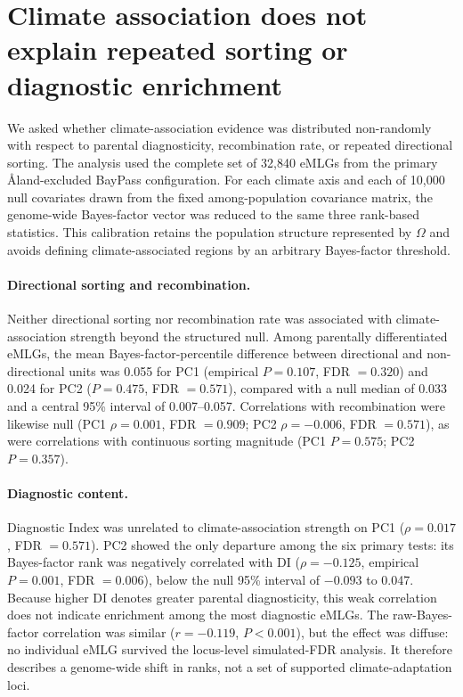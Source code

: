 
\section{Climate association does not explain repeated sorting or diagnostic enrichment}\label{sr:climate}

We asked whether climate-association evidence was distributed non-randomly with respect
to parental diagnosticity, recombination rate, or repeated directional sorting. The
analysis used the complete set of 32{,}840 eMLGs from the primary {\AA}land-excluded
BayPass configuration. For each climate axis and each of 10{,}000 null covariates drawn
from the fixed among-population covariance matrix, the genome-wide Bayes-factor vector
was reduced to the same three rank-based statistics. This calibration retains the
population structure represented by $\Omega$ and avoids defining climate-associated
regions by an arbitrary Bayes-factor threshold.

\paragraph{Directional sorting and recombination.} Neither directional sorting
nor recombination rate was associated with climate-association strength beyond the
structured null. Among parentally differentiated eMLGs, the mean Bayes-factor-percentile
difference between directional and non-directional units was 0.055 for PC1 (empirical
$P=0.107$, FDR $=0.320$) and 0.024 for PC2 ($P=0.475$, FDR $=0.571$), compared with a
null median of 0.033 and a central 95\% interval of 0.007--0.057. Correlations with
recombination were likewise null (PC1 $\rho=0.001$, FDR $=0.909$; PC2 $\rho=-0.006$,
FDR $=0.571$), as were correlations with continuous sorting magnitude (PC1 $P=0.575$;
PC2 $P=0.357$).

\paragraph{Diagnostic content.} Diagnostic Index was unrelated to climate-association
strength on PC1 ($\rho=0.017$, FDR $=0.571$). PC2 showed the only departure among the
six primary tests: its Bayes-factor rank was negatively correlated with DI
($\rho=-0.125$, empirical $P=0.001$, FDR $=0.006$), below the null 95\% interval of
$-0.093$ to 0.047. Because higher DI denotes greater parental diagnosticity, this weak
correlation does not indicate enrichment among the most diagnostic eMLGs. The raw-Bayes-
factor correlation was similar ($r=-0.119$, $P<0.001$), but the effect was diffuse: no
individual eMLG survived the locus-level simulated-FDR analysis. It therefore describes
a genome-wide shift in ranks, not a set of supported climate-adaptation loci.

